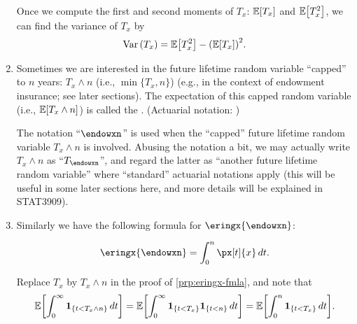 \begin{enumerate}
Once we compute the first and second moments of \(T_x\): \(\mathbb{E}\qty[T_x]\) and
\(\mathbb{E}\qty[T_x^2]\), we can find the variance of \(T_x\) by
\[
\operatorname{Var}\qty(T_x)=\mathbb{E}\qty[T_x^2]-\qty(\mathbb{E}\qty[T_x])^2.
\]

\item Sometimes we are interested in the future lifetime random variable
``capped'' to \(n\) years: \(T_x\wedge n\) (i.e., \(\min\{T_x, n\}\)) (e.g., in
the context of endowment insurance; see later sections). The expectation of
this capped random variable (i.e., \(\mathbb{E}\qty[T_x\wedge n]\)) is called the
. (Actuarial notation:
)

\begin{note}
The notation ``\(\endowxn\)'' is used when the ``capped'' future lifetime
random variable \(T_x\wedge n\) is involved. Abusing the notation a bit, we may
actually write \(T_x\wedge n\) as ``\(T_{\endowxn}\)'', and regard the latter
as ``another future lifetime random variable'' where ``standard'' actuarial
notations apply (this will be useful in some later sections here, and more
details will be explained in STAT3909).
\end{note}

\item Similarly we have the following formula for \(\eringx{\endowxn}\):
\begin{proposition}
\label{prp:eringxn-fmla}
\[
\eringx{\endowxn}=\int_{0}^{n}\px[t]{x}\,dt.
\]
\end{proposition}
\begin{pf}
Replace \(T_x\) by \(T_x\wedge n\) in the proof of \cref{prp:eringx-fmla}, and note that
\[
\mathbb{E}\qty[\int_{0}^{\infty}\mathbf{1}_{\left\{t<T_x\wedge n\right\}}\,dt]
=\mathbb{E}\qty[\int_{0}^{\infty}\mathbf{1}_{\left\{t<T_x\right\}}\mathbf{1}_{\left\{t<n\right\}}\,dt]
=\mathbb{E}\qty[\int_{0}^{n}\mathbf{1}_{\left\{t<T_x\right\}}\,dt].
\]
\end{pf}
\end{enumerate}
